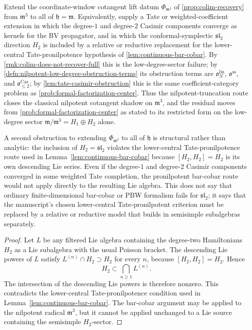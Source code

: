 \begin{prob}
\label{prob:linear-sector-lift}
Extend the coordinate-window cotangent lift datum $\Phi_{\mathfrak m^3}$ of
\ref{prop:colim-recovery} from $\mathfrak m^3$ to all of
$\mathfrak h=\mathfrak m$. Equivalently, supply a Tate or
weighted-coefficient extension in which the degree-$1$ and
degree-$2$ Casimir components converge as kernels for the BV
propagator, and in which the conformal-symplectic
$\mathfrak{sl}_2$ direction $H_2$ is included by a relative or reductive
replacement for the lower-central Tate-pronilpotence hypothesis of
\ref{lem:continuous-bar-cobar}. By
\ref{rmk:colim-does-not-recover-full} this is the
low-degree-sector failure; by
\ref{defn:nilpotent-low-degree-obstruction-terms} its obstruction
terms are
\(\mathfrak o^{\mathrm{lin}}_N\),
\(\mathfrak o^{\mathrm{ss}}\), and
\(\mathfrak o^{\mathrm{Cas}}_{\leq2}\); by
\ref{lem:tate-casimir-obstruction}
this is the same coefficient-category problem as
\ref{prob:formal-factorization-center}. Thus the nilpotent-truncation route
closes the classical nilpotent cotangent shadow on $\mathfrak m^3$, and the
residual moves from \ref{prob:formal-factorization-center} as stated
to its restricted form on the low-degree sector
$\mathfrak m/\mathfrak m^3=H_1\oplus H_2$ alone.
\end{prob}

\begin{thm}
\label{rmk:conilpotency-essential}
A second obstruction to extending $\Phi_{\mathfrak m^3}$ to all of
$\mathfrak h$ is structural rather than analytic: the inclusion of
$H_2=\mathfrak{sl}_2$ violates the lower-central Tate-pronilpotence route
used in Lemma~\ref{lem:continuous-bar-cobar} because
$[H_2,H_2]=H_2$ is its own descending Lie series. Even if the
degree-$1$ and degree-$2$ Casimir components converged in some
weighted Tate completion, the pronilpotent bar-cobar route would not
apply directly to the resulting Lie algebra.  This does not say that
ordinary finite-dimensional bar-cobar or PBW formalism fails for
\(\mathfrak{sl}_2\); it says that the manuscript's chosen lower-central
Tate-pronilpotent criterion must be replaced by a relative or reductive
model that builds in semisimple subalgebras separately.
\end{thm}

\begin{proof}
  Let \(L\) be any filtered Lie algebra containing the degree-two
  Hamiltonians \(H_2\) as a Lie subalgebra with the usual Poisson
  bracket.  The descending Lie powers of \(L\) satisfy
  \(L^{(n)}\cap H_2\supset H_2\) for every \(n\), because
  \([H_2,H_2]=H_2\).  Hence
  \[
    H_2\subset \bigcap_{n\geq1} L^{(n)} .
  \]
  The intersection of the descending Lie powers is therefore nonzero.
  This contradicts the lower-central Tate-pronilpotence condition used in
  Lemma~\ref{lem:continuous-bar-cobar}.  The bar-cobar argument may be
  applied to the nilpotent radical \(\mathfrak m^3\), but it cannot be
  applied unchanged to a Lie source containing the semisimple
  \(H_2\)-sector.
\end{proof}


